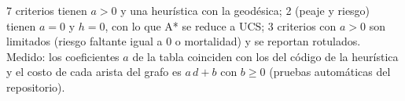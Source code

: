 {7 criterios tienen $a > 0$ y una heurística con la geodésica; 2 (peaje y riesgo) tienen $a = 0$ y $h = 0$, con lo que A* se reduce a UCS; 3 criterios con $a > 0$ son limitados (riesgo faltante igual a 0 o mortalidad) y se reportan rotulados.}
{Medido: los coeficientes $a$ de la tabla coinciden con los del código de la heurística y el costo de cada arista del grafo es $a\,d + b$ con $b \ge 0$ (pruebas automáticas del repositorio).}
